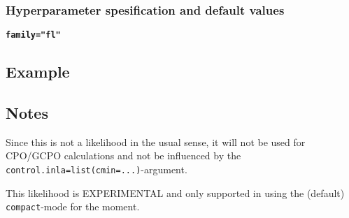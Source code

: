 \documentclass[a4paper,11pt]{article}
\begin{document}
\subsubsection*{Hyperparameter spesification and default values}

\textbf{\texttt{family="fl"}}


\subsection*{Example}



\subsection*{Notes}

Since this is not a likelihood in the usual sense, it will not be used
for CPO/GCPO calculations and not be influenced by the
\texttt{control.inla=list(cmin=...)}-argument.

This likelihood is EXPERIMENTAL and only supported in using the
(default) \texttt{compact}-mode for the moment.
\end{document}
